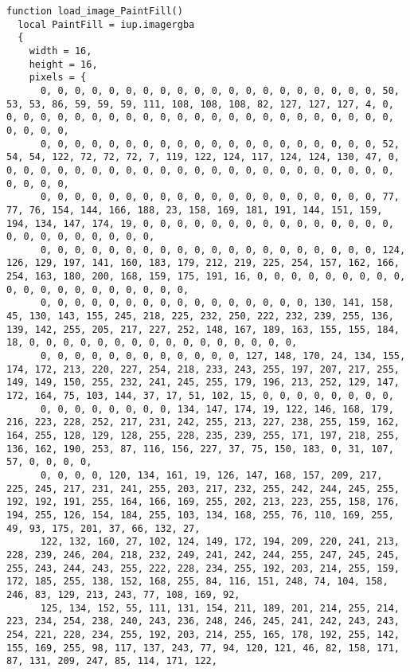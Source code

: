 \documentclass{ctexart}
\begin{document}
\begin{lstlisting}
function load_image_PaintFill()
  local PaintFill = iup.imagergba
  {
    width = 16,
    height = 16,
    pixels = {
      0, 0, 0, 0, 0, 0, 0, 0, 0, 0, 0, 0, 0, 0, 0, 0, 0, 0, 0, 0, 50, 53, 53, 86, 59, 59, 59, 111, 108, 108, 108, 82, 127, 127, 127, 4, 0, 0, 0, 0, 0, 0, 0, 0, 0, 0, 0, 0, 0, 0, 0, 0, 0, 0, 0, 0, 0, 0, 0, 0, 0, 0, 0, 0, 
      0, 0, 0, 0, 0, 0, 0, 0, 0, 0, 0, 0, 0, 0, 0, 0, 0, 0, 0, 0, 52, 54, 54, 122, 72, 72, 72, 7, 119, 122, 124, 117, 124, 124, 130, 47, 0, 0, 0, 0, 0, 0, 0, 0, 0, 0, 0, 0, 0, 0, 0, 0, 0, 0, 0, 0, 0, 0, 0, 0, 0, 0, 0, 0, 
      0, 0, 0, 0, 0, 0, 0, 0, 0, 0, 0, 0, 0, 0, 0, 0, 0, 0, 0, 0, 77, 77, 76, 154, 144, 166, 188, 23, 158, 169, 181, 191, 144, 151, 159, 194, 134, 147, 174, 19, 0, 0, 0, 0, 0, 0, 0, 0, 0, 0, 0, 0, 0, 0, 0, 0, 0, 0, 0, 0, 0, 0, 0, 0, 
      0, 0, 0, 0, 0, 0, 0, 0, 0, 0, 0, 0, 0, 0, 0, 0, 0, 0, 0, 0, 124, 126, 129, 197, 141, 160, 183, 179, 212, 219, 225, 254, 157, 162, 166, 254, 163, 180, 200, 168, 159, 175, 191, 16, 0, 0, 0, 0, 0, 0, 0, 0, 0, 0, 0, 0, 0, 0, 0, 0, 0, 0, 0, 0, 
      0, 0, 0, 0, 0, 0, 0, 0, 0, 0, 0, 0, 0, 0, 0, 0, 130, 141, 158, 45, 130, 143, 155, 245, 218, 225, 232, 250, 222, 232, 239, 255, 136, 139, 142, 255, 205, 217, 227, 252, 148, 167, 189, 163, 155, 155, 184, 18, 0, 0, 0, 0, 0, 0, 0, 0, 0, 0, 0, 0, 0, 0, 0, 0, 
      0, 0, 0, 0, 0, 0, 0, 0, 0, 0, 0, 0, 127, 148, 170, 24, 134, 155, 174, 172, 213, 220, 227, 254, 218, 233, 243, 255, 197, 207, 217, 255, 149, 149, 150, 255, 232, 241, 245, 255, 179, 196, 213, 252, 129, 147, 172, 164, 75, 103, 144, 37, 17, 51, 102, 15, 0, 0, 0, 0, 0, 0, 0, 0, 
      0, 0, 0, 0, 0, 0, 0, 0, 134, 147, 174, 19, 122, 146, 168, 179, 216, 223, 228, 252, 217, 231, 242, 255, 213, 227, 238, 255, 159, 162, 164, 255, 128, 129, 128, 255, 228, 235, 239, 255, 171, 197, 218, 255, 136, 162, 190, 253, 87, 116, 156, 227, 37, 75, 150, 183, 0, 31, 107, 57, 0, 0, 0, 0, 
      0, 0, 0, 0, 120, 134, 161, 19, 126, 147, 168, 157, 209, 217, 225, 245, 217, 231, 241, 255, 203, 217, 232, 255, 242, 244, 245, 255, 192, 192, 191, 255, 164, 166, 169, 255, 202, 213, 223, 255, 158, 176, 194, 255, 126, 154, 184, 255, 103, 134, 168, 255, 76, 110, 169, 255, 49, 93, 175, 201, 37, 66, 132, 27, 
      122, 132, 160, 27, 102, 124, 149, 172, 194, 209, 220, 241, 213, 228, 239, 246, 204, 218, 232, 249, 241, 242, 244, 255, 247, 245, 245, 255, 243, 244, 243, 255, 222, 228, 234, 255, 192, 203, 214, 255, 159, 172, 185, 255, 138, 152, 168, 255, 84, 116, 151, 248, 74, 104, 158, 246, 83, 129, 213, 243, 77, 108, 169, 92, 
      125, 134, 152, 55, 111, 131, 154, 211, 189, 201, 214, 255, 214, 223, 234, 254, 238, 240, 243, 236, 248, 246, 245, 241, 242, 243, 243, 254, 221, 228, 234, 255, 192, 203, 214, 255, 165, 178, 192, 255, 142, 155, 169, 255, 98, 117, 137, 243, 77, 94, 120, 121, 46, 82, 158, 171, 87, 131, 209, 247, 85, 114, 171, 122, 

\end{lstlisting}
\end{document}
